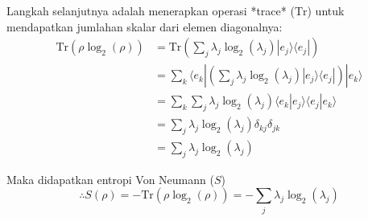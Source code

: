 Langkah selanjutnya adalah menerapkan operasi *trace* ($\text{Tr}$) untuk mendapatkan jumlahan skalar dari elemen diagonalnya:
\begin{equation}
\begin{split}
    \text{Tr}(\rho \log_2(\rho)) &= \text{Tr} \left( \sum_j \lambda_j \log_2(\lambda_j) |e_j\rangle \langle e_j| \right) \\
    &= \sum_k \langle e_k | \left( \sum_j \lambda_j \log_2(\lambda_j) |e_j\rangle \langle e_j| \right) |e_k\rangle \\
    &= \sum_k \sum_j \lambda_j \log_2(\lambda_j) \langle e_k | e_j \rangle \langle e_j | e_k \rangle \\
    &= \sum_j \lambda_j \log_2(\lambda_j) \delta_{kj} \delta_{jk} \\
    &= \sum_j \lambda_j \log_2(\lambda_j)
\end{split}
\end{equation}

Maka didapatkan entropi Von Neumann ($S$)
\begin{equation}
    \therefore S(\rho) = -\text{Tr}(\rho \log_2(\rho)) = -\sum_j \lambda_j \log_2 (\lambda_j)
\end{equation}
